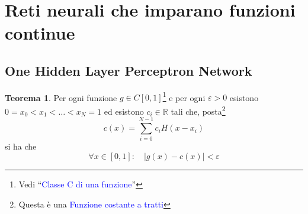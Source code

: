\documentclass[10pt]{book}
\newcommand{\1}{\mathds{1}}
\newcommand{\R}{\mathds{R}}
\theoremstyle{definition}%
\newtheorem{thm}{Teorema}[section]
\theoremstyle{plain}
\theoremstyle{remark}
\renewcommand{\href}[2]{\textcolor{blue}{#2}}
\begin{document}
\section{Reti neurali che imparano funzioni continue}
\label{sec:org43f9cd0}

\subsection{One Hidden Layer Perceptron Network}
\label{sec:orgb4841a6}
\begin{thm}
Per ogni funzione \(g \in C[0,1]\)\footnote{Vedi ``\href{../../../../../org/roam/20250113125602-classe_c_di_una_funzione.org}{Classe C di una funzione}''} e per ogni \(\varepsilon>0\) esistono \(0=x_{0}<x_{1}<\dots<x_{N} = 1\) ed esistono \(c_{i} \in \R\) tali che, posta\footnote{Questa è una \href{../../../../../org/roam/20250701140621-funzione_costante_a_tratti.org}{Funzione costante a tratti}}
\begin{equation*}
c(x) = \sum_{i=0}^{N-1} c_{i} H(x-x_{i})
\end{equation*}
si ha che
\begin{equation*}
\forall x \in [0,1]:\quad |g(x)-c(x)|<\varepsilon
\end{equation*}
\end{thm}
\end{document}
